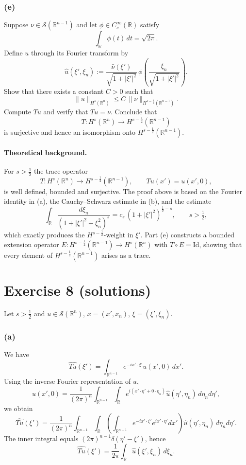 \documentclass[12pt,a4paper]{article}
\theoremstyle{plain}
\theoremstyle{definition}
\theoremstyle{remark}
\theoremstyle{remark}
\begin{document}
\subsubsection*{(e)}
Suppose $\nu\in\mathcal S(\mathbb R^{n-1})$ and let $\phi\in C_c^\infty(\mathbb R)$ satisfy
\[
\int_{\mathbb R}\phi(t)\,dt = \sqrt{2\pi}.
\]
Define $u$ through its Fourier transform by
\[
\widehat u(\xi',\xi_n)
:= \frac{\widehat\nu(\xi')}{\sqrt{1+|\xi'|^2}}\,
\phi\!\left(\frac{\xi_n}{\sqrt{1+|\xi'|^2}}\right).
\]
Show that there exists a constant $C>0$ such that
\[
\|u\|_{H^s(\mathbb R^n)} \le C\,\|\nu\|_{H^{s-\frac12}(\mathbb R^{n-1})}.
\]
Compute $Tu$ and verify that $Tu=\nu$. Conclude that
\[
T:H^s(\mathbb R^n)\longrightarrow H^{s-\frac12}(\mathbb R^{n-1})
\]
is surjective and hence an isomorphism onto $H^{s-\frac12}(\mathbb R^{n-1})$.

\bigskip

\paragraph{Theoretical background.}
For $s>\tfrac12$ the trace operator
\[
T:H^s(\mathbb R^n)\to H^{s-\frac12}(\mathbb R^{n-1}),
\qquad Tu(x')=u(x',0),
\]
is well defined, bounded and surjective. The proof above is based on the
Fourier identity in (a), the Cauchy--Schwarz estimate in (b),
and the estimate
\[
\int_{\mathbb R}\frac{d\xi_n}{(1+|\xi'|^2+\xi_n^2)^s}
= c_s\,(1+|\xi'|^2)^{\frac12-s},\qquad s>\tfrac12,
\]
which exactly produces the $H^{s-\frac12}$-weight in $\xi'$.
Part (e) constructs a bounded extension operator
$E:H^{s-\frac12}(\mathbb R^{n-1})\to H^s(\mathbb R^n)$ with $T\circ E=\mathrm{Id}$,
showing that every element of $H^{s-\frac12}(\mathbb R^{n-1})$ arises as a trace.

\section*{Exercise 8 (solutions)}

Let $s>\tfrac12$ and $u\in\mathcal S(\mathbb R^n)$, $x=(x',x_n)$, $\xi=(\xi',\xi_n)$.

\subsubsection*{(a)}
We have
\[
\widehat{Tu}(\xi')
= \int_{\mathbb R^{n-1}} e^{-ix'\cdot\xi'}u(x',0)\,dx'.
\]
Using the inverse Fourier representation of $u$,
\[
u(x',0)
= \frac{1}{(2\pi)^n}\int_{\mathbb R^{n-1}}\!\int_{\mathbb R}
e^{i(x'\cdot\eta'+0\cdot\eta_n)}\widehat u(\eta',\eta_n)\,d\eta_n d\eta',
\]
we obtain
\[
\widehat{Tu}(\xi')
= \frac{1}{(2\pi)^n}\int_{\mathbb R^{n-1}}\!\int_{\mathbb R}
\left(\int_{\mathbb R^{n-1}} e^{-ix'\cdot\xi'}e^{ix'\cdot\eta'}dx'\right)
\widehat u(\eta',\eta_n)\,d\eta_n d\eta'.
\]
The inner integral equals $(2\pi)^{n-1}\delta(\eta'-\xi')$, hence
\[
\widehat{Tu}(\xi') = \frac{1}{2\pi}\int_{\mathbb R}\widehat u(\xi',\xi_n)\,d\xi_n.
\]
\end{document}
